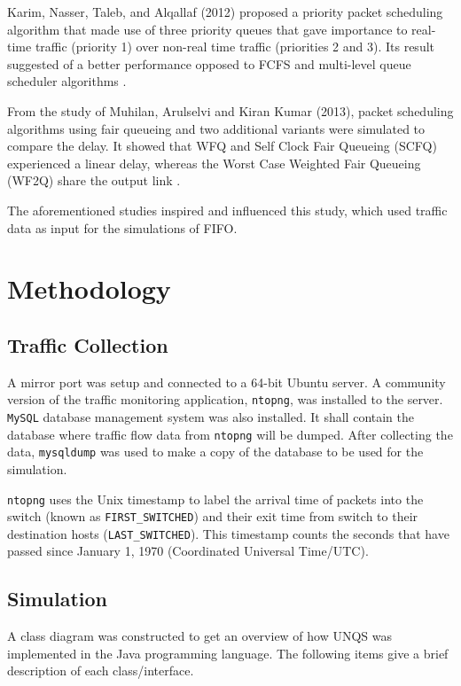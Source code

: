 \documentclass[journal]{IEEE/IEEEtran}
\begin{document}
Karim, Nasser, Taleb, and Alqallaf (2012) proposed a priority packet scheduling algorithm that made use of three priority queues that gave importance to real-time traffic (priority 1) over non-real time traffic (priorities 2 and 3). Its result suggested of a better performance opposed to FCFS and multi-level queue scheduler algorithms \cite{karim_2012}.

From the study of Muhilan, Arulselvi and Kiran Kumar (2013), packet scheduling algorithms using fair queueing and two additional variants were simulated to compare the delay. It showed that WFQ and Self Clock Fair Queueing (SCFQ) experienced a linear delay, whereas the Worst Case Weighted Fair Queueing (WF2Q) share the output link \cite{muhilan_2013}.

The aforementioned studies inspired and influenced this study, which used traffic data as input for the simulations of FIFO.

\section{Methodology}
\subsection{Traffic Collection}
A mirror port was setup and connected to a 64-bit Ubuntu server. A community version of the traffic monitoring application, \texttt{ntopng}, was installed to the server. \texttt{MySQL} database management system was also installed. It shall contain the database where traffic flow data from \texttt{ntopng} will be dumped. After collecting the data, \texttt{mysqldump} was used to make a copy of the database to be used for the simulation.

\texttt{ntopng} uses the Unix timestamp to label the arrival time of packets into the switch (known as \texttt{FIRST\_SWITCHED}) and their exit time from switch to their destination hosts (\texttt{LAST\_SWITCHED}). This timestamp counts the seconds that have passed since January 1, 1970 (Coordinated Universal Time/UTC).

\subsection{Simulation}


A class diagram  was constructed to get an overview of how UNQS was implemented in the Java programming language. The following items give a brief description of each class/interface.
\end{document}
